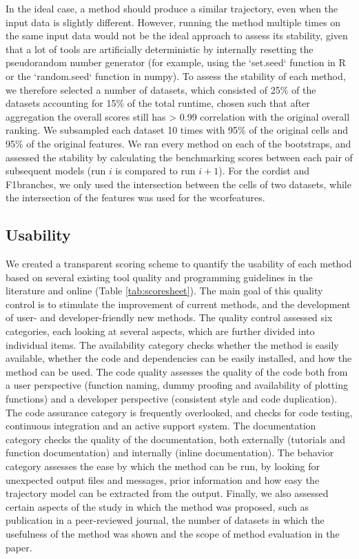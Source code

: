 In the ideal case, a method should produce a similar trajectory, even when the input data is slightly different. However, running the method multiple times on the same input data would not be the ideal approach to assess its stability, given that a lot of tools are artificially deterministic by internally resetting the pseudorandom number generator (for example, using the `set.seed` function in R or the `random.seed` function in numpy). To assess the stability of each method, we therefore selected a number of datasets, which consisted of 25$\%$ of the datasets accounting for 15$\%$ of the total runtime, chosen such that after aggregation the overall scores still has > 0.99 correlation with the original overall ranking. We subsampled each dataset 10 times with 95$\%$ of the original cells and 95$\%$ of the original features. We ran every method on each of the bootstraps, and assessed the stability by calculating the benchmarking scores between each pair of subsequent models (run $i$ is compared to run $i+1$). For the cordist and F1branches, we only used the intersection between the cells of two datasets, while the intersection of the features was used for the wcorfeatures.

\subsection{Usability}

We created a transparent scoring scheme to quantify the usability of each method based on several existing tool quality and programming guidelines in the literature and online (Table \ref{tab:scoresheet}). The main goal of this quality control is to stimulate the improvement of current methods, and the development of user- and developer-friendly new methods. The quality control assessed six categories, each looking at several aspects, which are further divided into individual items. The availability category checks whether the method is easily available, whether the code and dependencies can be easily installed, and how the method can be used. The code quality assesses the quality of the code both from a user perspective (function naming, dummy proofing and availability of plotting functions) and a developer perspective (consistent style and code duplication). The code assurance category is frequently overlooked, and checks for code testing, continuous integration \cite{beaulieu-jones_reproducibilitycomputationalworkflows_2017} and an active support system. The documentation category checks the quality of the documentation, both externally (tutorials and function documentation) and internally (inline documentation). The behavior category assesses the ease by which the method can be run, by looking for unexpected output files and messages, prior information and how easy the trajectory model can be extracted from the output. Finally, we also assessed certain aspects of the study in which the method was proposed, such as publication in a peer-reviewed journal, the number of datasets in which the usefulness of the method was shown and the scope of method evaluation in the paper.

